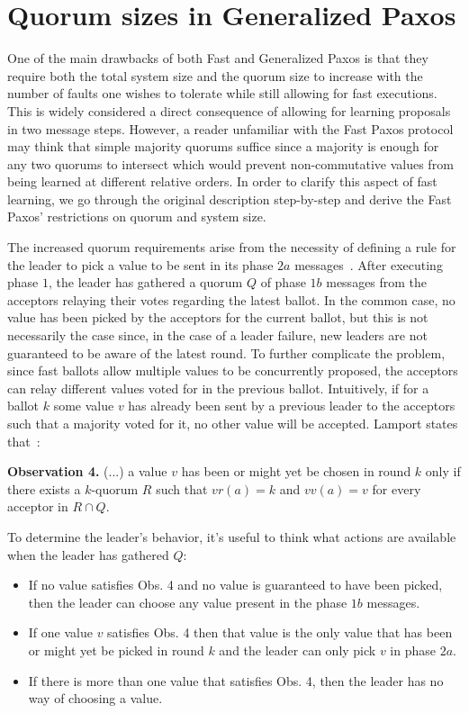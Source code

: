 \section{Quorum sizes in Generalized Paxos} 
One of the main drawbacks of both Fast and Generalized Paxos is that they require both the total system size and the quorum size to increase with the number of faults one wishes to tolerate while still allowing for fast executions. This is widely considered a direct consequence of allowing for learning proposals in two message steps. However, a reader unfamiliar with the Fast Paxos protocol may think that simple majority quorums suffice since a majority is enough for any two quorums to intersect which would prevent non-commutative values from being learned at different relative orders. In order to clarify this aspect of fast learning, we go through the original description step-by-step and derive the Fast Paxos' restrictions on quorum and system size.\par
The increased quorum requirements arise from the necessity of defining a rule for the leader to pick a value to be sent in its phase $2a$ messages~\cite{Lamport2006}. After executing phase $1$, the leader has gathered a quorum $Q$ of phase $1b$ messages from the acceptors relaying their votes regarding the latest ballot. In the common case, no value has been picked by the acceptors for the current ballot, but this is not necessarily the case since, in the case of a leader failure, new leaders are not guaranteed to be aware of the latest round. To further complicate the problem, since fast ballots allow multiple values to be concurrently proposed, the acceptors can relay different values voted for in the previous ballot. Intuitively, if for a ballot $k$ some value $v$ has already been sent by a previous leader to the acceptors such that a majority voted for it, no other value will be accepted. Lamport states that~\cite{Lamport2006}:\par

\begin{displayquote}
	\textbf{Observation 4.} (...) a value $v$ has been or might yet be chosen in round $k$ only if there exists a $k$-quorum $R$ such that $vr(a)=k$ and $vv(a)=v$ for every acceptor in $R \cap Q$.
\end{displayquote}

To determine the leader's behavior, it's useful to think what actions are available when the leader has gathered $Q$:
\begin{itemize}
	\item If no value satisfies Obs. 4 and no value is guaranteed to have been picked, then the leader can choose any value present in the phase $1b$ messages.
	\item If one value $v$ satisfies Obs. 4 then that value is the only value that has been or might yet be picked in round $k$ and the leader can only pick $v$ in phase $2a$.
	\item If there is more than one value that satisfies Obs. 4, then the leader has no way of choosing a value.
\end{itemize} 

